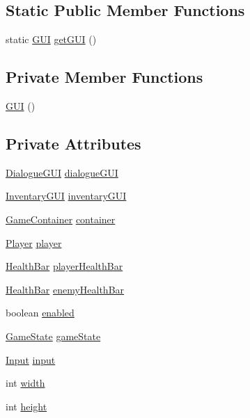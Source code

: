 \subsection*{Static Public Member Functions}
\begin{DoxyCompactItemize}
\item 
static \mbox{\hyperlink{classgui_1_1_g_u_i}{G\+UI}} \mbox{\hyperlink{classgui_1_1_g_u_i_add7463648463cd7ea7c058022476077c}{get\+G\+UI}} ()
\end{DoxyCompactItemize}
\subsection*{Private Member Functions}
\begin{DoxyCompactItemize}
\item 
\mbox{\hyperlink{classgui_1_1_g_u_i_a2615d0a83cbc5e536a84b34f4f5fed77}{G\+UI}} ()
\end{DoxyCompactItemize}
\subsection*{Private Attributes}
\begin{DoxyCompactItemize}
\item 
\mbox{\hyperlink{classgui_1_1_dialogue_g_u_i}{Dialogue\+G\+UI}} \mbox{\hyperlink{classgui_1_1_g_u_i_ae48d5f580a490dd73bc59e64937cc46f}{dialogue\+G\+UI}}
\item 
\mbox{\hyperlink{classgui_1_1_inventary_g_u_i}{Inventary\+G\+UI}} \mbox{\hyperlink{classgui_1_1_g_u_i_afaa90863a9a224c2a8ebb22ae6a71d8a}{inventary\+G\+UI}}
\item 
\mbox{\hyperlink{classorg_1_1newdawn_1_1slick_1_1_game_container}{Game\+Container}} \mbox{\hyperlink{classgui_1_1_g_u_i_acaa3c69a02ef67d6ebd11fcbcc87049d}{container}}
\item 
\mbox{\hyperlink{classentities_1_1_player}{Player}} \mbox{\hyperlink{classgui_1_1_g_u_i_a96b66f816e243b9bae9754fba26f5cd2}{player}}
\item 
\mbox{\hyperlink{classgui_1_1_health_bar}{Health\+Bar}} \mbox{\hyperlink{classgui_1_1_g_u_i_aeda1474169fcb850223c8c6da6b49c89}{player\+Health\+Bar}}
\item 
\mbox{\hyperlink{classgui_1_1_health_bar}{Health\+Bar}} \mbox{\hyperlink{classgui_1_1_g_u_i_a541d8aa4232f2616f9e085cf0879fc31}{enemy\+Health\+Bar}}
\item 
boolean \mbox{\hyperlink{classgui_1_1_g_u_i_ac666fbd257937cf3560d48acafe419ce}{enabled}}
\item 
\mbox{\hyperlink{classstates_1_1_game_state}{Game\+State}} \mbox{\hyperlink{classgui_1_1_g_u_i_a3c90a4cfa6b20ea3635bbc7eda176de0}{game\+State}}
\item 
\mbox{\hyperlink{classorg_1_1newdawn_1_1slick_1_1_input}{Input}} \mbox{\hyperlink{classgui_1_1_g_u_i_ac55a04087c6c03c6d36d5143e0353c00}{input}}
\item 
int \mbox{\hyperlink{classgui_1_1_g_u_i_abee5ec9c848eff89fb38b5b7237f8afa}{width}}
\item 
int \mbox{\hyperlink{classgui_1_1_g_u_i_a3e3efe56fc6ab1b8f52dd22cbc549d91}{height}}
\end{DoxyCompactItemize}
